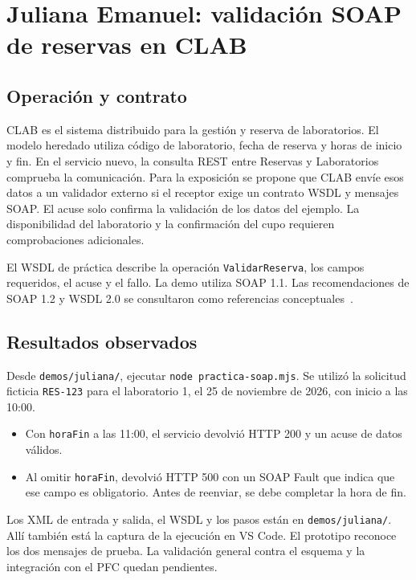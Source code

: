 \section{Juliana Emanuel: validación SOAP de reservas en CLAB}

\subsection{Operación y contrato}
CLAB es el sistema distribuido para la gestión y reserva de laboratorios. El modelo heredado utiliza código de laboratorio, fecha de reserva y horas de inicio y fin. En el servicio nuevo, la consulta REST entre Reservas y Laboratorios comprueba la comunicación. Para la exposición se propone que CLAB envíe esos datos a un validador externo si el receptor exige un contrato WSDL y mensajes SOAP. El acuse solo confirma la validación de los datos del ejemplo. La disponibilidad del laboratorio y la confirmación del cupo requieren comprobaciones adicionales.

El WSDL de práctica describe la operación \texttt{ValidarReserva}, los campos requeridos, el acuse y el fallo. La demo utiliza SOAP 1.1. Las recomendaciones de SOAP 1.2 y WSDL 2.0 se consultaron como referencias conceptuales~\cite{w3c-soap12-juliana,w3c-wsdl20-juliana}.

\subsection{Resultados observados}
Desde \texttt{demos/juliana/}, ejecutar \texttt{node practica-soap.mjs}. Se utilizó la solicitud ficticia \texttt{RES-123} para el laboratorio 1, el 25 de noviembre de 2026, con inicio a las 10:00.
\begin{itemize}
  \item Con \texttt{horaFin} a las 11:00, el servicio devolvió HTTP 200 y un acuse de datos válidos.
  \item Al omitir \texttt{horaFin}, devolvió HTTP 500 con un SOAP Fault que indica que ese campo es obligatorio. Antes de reenviar, se debe completar la hora de fin.
\end{itemize}
Los XML de entrada y salida, el WSDL y los pasos están en \texttt{demos/juliana/}. Allí también está la captura de la ejecución en VS Code. El prototipo reconoce los dos mensajes de prueba. La validación general contra el esquema y la integración con el PFC quedan pendientes.

